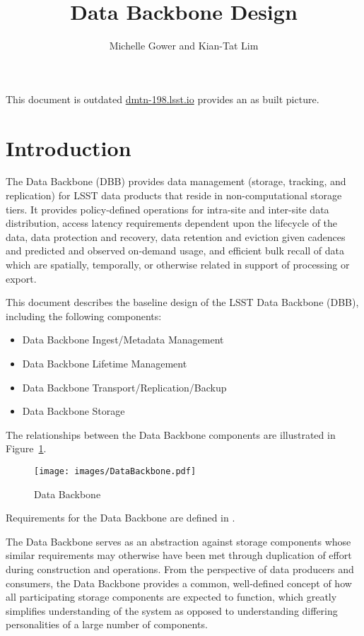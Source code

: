 \documentclass[DM,obsolete,authoryear,toc]{lsstdoc}
\title{Data Backbone Design}
\author{%
Michelle Gower and
Kian-Tat Lim
}
\date{\vcsDate}
\begin{document}
\maketitle


{\color{red} This document is outdated \url{dmtn-198.lsst.io} provides an as built picture. }
\section{Introduction}\label{introduction}

The Data Backbone (DBB) provides data management (storage, tracking, and
replication) for LSST data products that reside in non-computational storage
tiers.  It provides policy-defined operations for intra-site and inter-site
data distribution, access latency requirements dependent upon the lifecycle of
the data, data protection and recovery, data retention and eviction given
cadences and predicted and observed on-demand usage, and efficient bulk recall
of data which are spatially, temporally, or otherwise related in support of
processing or export.

This document describes the baseline design of the LSST Data Backbone (DBB),
including the following components:

\begin{itemize}
	\item Data Backbone Ingest/Metadata Management
	\item Data Backbone Lifetime Management
	\item Data Backbone Transport/Replication/Backup
	\item Data Backbone Storage
\end{itemize}

The relationships between the Data Backbone components are illustrated
in Figure~\ref{fig:dbb}.

\begin{figure}
\centering
\texttt{[image: images/DataBackbone.pdf]}
\caption{Data Backbone}
\label{fig:dbb}
\end{figure}

Requirements for the Data Backbone are defined in .

The Data Backbone serves as an abstraction against storage components whose
similar requirements may otherwise have been met through duplication of effort
during construction and operations. From the perspective of data producers and
consumers, the Data Backbone provides a common, well-defined concept of how all
participating storage components are expected to function, which greatly
simplifies understanding of the system as opposed to understanding differing
personalities of a large number of components.
\end{document}
